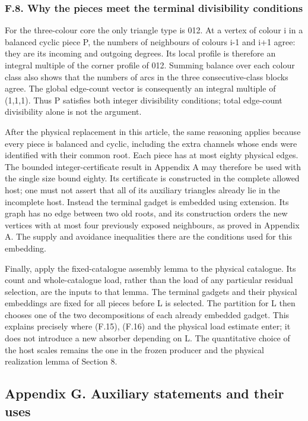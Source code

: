 \documentclass[english,11pt,a4paper]{article}
\begin{document}
\subsubsection{F.8. Why the pieces meet the terminal divisibility conditions}\label{f.8.-why-the-pieces-meet-the-terminal-divisibility-conditions}

For the three-colour core the only triangle type is 012. At a vertex of colour i in a balanced cyclic piece P, the numbers of neighbours of colours i-1 and i+1 agree: they are its incoming and outgoing degrees. Its local profile is therefore an integral multiple of the corner profile of 012. Summing balance over each colour class also shows that the numbers of arcs in the three consecutive-class blocks agree. The global edge-count vector is consequently an integral multiple of (1,1,1). Thus P satisfies both integer divisibility conditions; total edge-count divisibility alone is not the argument.

After the physical replacement in this article, the same reasoning applies because every piece is balanced and cyclic, including the extra channels whose ends were identified with their common root. Each piece has at most eighty physical edges. The bounded integer-certificate result in Appendix A may therefore be used with the single size bound eighty. Its certificate is constructed in the complete allowed host; one must not assert that all of its auxiliary triangles already lie in the incomplete host. Instead the terminal gadget is embedded using extension. Its graph has no edge between two old roots, and its construction orders the new vertices with at most four previously exposed neighbours, as proved in Appendix A. The supply and avoidance inequalities there are the conditions used for this embedding.

Finally, apply the fixed-catalogue assembly lemma to the physical catalogue. Its count and whole-catalogue load, rather than the load of any particular residual selection, are the inputs to that lemma. The terminal gadgets and their physical embeddings are fixed for all pieces before L is selected. The partition for L then chooses one of the two decompositions of each already embedded gadget. This explains precisely where (F.15), (F.16) and the physical load estimate enter; it does not introduce a new absorber depending on L. The quantitative choice of the host scales remains the one in the frozen producer and the physical realization lemma of Section 8.

\subsection{Appendix G. Auxiliary statements and their uses}\label{appendix-g.-auxiliary-statements-and-their-uses}
\end{document}
